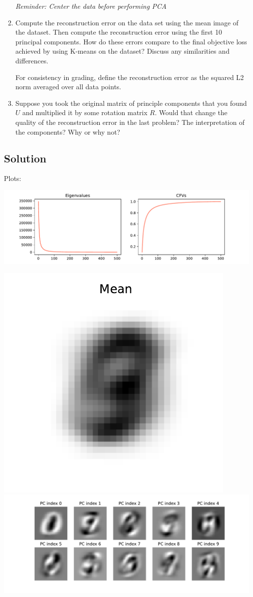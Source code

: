 \documentclass[submit]{harvardml}
\begin{document}
\begin{problem}
\begin{enumerate}
  \textit{Reminder: Center the data before performing PCA}

\item Compute the reconstruction error on the data set using the mean
  image of the dataset.  Then compute the reconstruction error using
  the first 10 principal components.  How do these errors compare to
  the final objective loss achieved by using K-means on the dataset?
  Discuss any similarities and differences.

  For consistency in grading, define the reconstruction error as the squared L2
  norm averaged over all data points.

\item Suppose you took the original matrix of principle components
  that you found $U$ and multiplied it by some rotation matrix $R$.
  Would that change the quality of the reconstruction error in the
  last problem?  The interpretation of the components?  Why or why
  not?
  
\end{enumerate}


\end{problem}

\newpage
\subsection*{Solution}
Plots:

 \includegraphics[width=\linewidth]{p2_cfvs}

\includegraphics[width=0.25\linewidth]{p2_mean}
\includegraphics[width=0.75\linewidth]{p2_pcomps}
\end{document}
